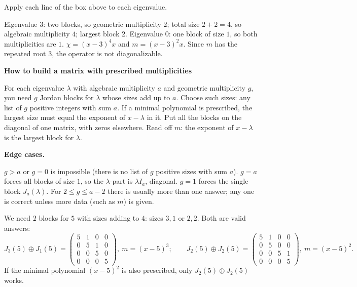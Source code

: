 \documentclass[10pt]{scrartcl}
\newenvironment{methodbox}[1]{\begin{mdframed}[style=mdbluebox,linecolor=NavyBlue,backgroundcolor=NavyBlue!3]\textbf{\color{NavyBlue}#1}\par\vspace{2pt}}{\end{mdframed}}
\begin{document}
\begin{example*}
  Apply each line of the box above to each eigenvalue.
  \begin{steps}
    \ii Eigenvalue $3$: two blocks, so geometric multiplicity $2$; total size $2+2=4$, so algebraic multiplicity $4$; largest block $2$.
    \ii Eigenvalue $0$: one block of size $1$, so both multiplicities are $1$.
    \ii $\chi=(x-3)^4x$ and $m=(x-3)^2x$. Since $m$ has the repeated root $3$, the operator is not diagonalizable.
  \end{steps}
\end{example*}

\begin{methodbox}{How to build a matrix with prescribed multiplicities}
\begin{enumerate}[label=\arabic*.,leftmargin=1.5em,itemsep=2pt,topsep=2pt]
  \ii For each eigenvalue $\lambda$ with algebraic multiplicity $a$ and geometric multiplicity $g$, you need $g$ Jordan blocks for $\lambda$ whose sizes add up to $a$.
  \ii Choose such sizes: any list of $g$ positive integers with sum $a$. If a minimal polynomial is prescribed, the largest size must equal the exponent of $x-\lambda$ in it.
  \ii Put all the blocks on the diagonal of one matrix, with zeros elsewhere.
  \ii Read off $m$: the exponent of $x-\lambda$ is the largest block for $\lambda$.
\end{enumerate}
\textbf{Edge cases.}
\begin{itemize}
  \ii $g>a$ or $g=0$ is impossible (there is no list of $g$ positive sizes with sum $a$).
  \ii $g=a$ forces all blocks of size $1$, so the $\lambda$-part is $\lambda I_a$, diagonal. $g=1$ forces the single block $J_a(\lambda)$.
  \ii For $2\le g\le a-2$ there is usually more than one answer; any one is correct unless more data (such as $m$) is given.
\end{itemize}
\end{methodbox}

\begin{example*}
  We need $2$ blocks for $5$ with sizes adding to $4$: sizes $3,1$ or $2,2$. Both are valid answers:
  \[ J_3(5)\oplus J_1(5)=\begin{pmatrix}5&1&0&0\\0&5&1&0\\0&0&5&0\\0&0&0&5\end{pmatrix},\ m=(x-5)^3;\qquad J_2(5)\oplus J_2(5)=\begin{pmatrix}5&1&0&0\\0&5&0&0\\0&0&5&1\\0&0&0&5\end{pmatrix},\ m=(x-5)^2. \]
  If the minimal polynomial $(x-5)^2$ is also prescribed, only $J_2(5)\oplus J_2(5)$ works.
\end{example*}
\end{document}
